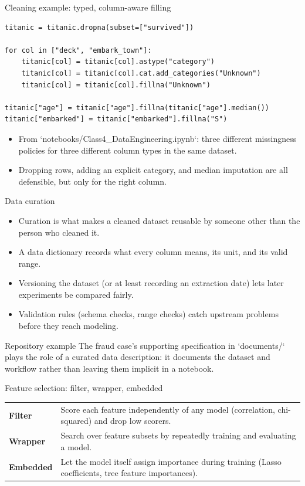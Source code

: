 \begin{frame}[fragile]{Cleaning example: typed, column-aware filling}
\begin{lstlisting}[style=coursepython]
titanic = titanic.dropna(subset=["survived"])

for col in ["deck", "embark_town"]:
    titanic[col] = titanic[col].astype("category")
    titanic[col] = titanic[col].cat.add_categories("Unknown")
    titanic[col] = titanic[col].fillna("Unknown")

titanic["age"] = titanic["age"].fillna(titanic["age"].median())
titanic["embarked"] = titanic["embarked"].fillna("S")
\end{lstlisting}
\begin{itemize}
\item From `notebooks/Class4_DataEngineering.ipynb`: three different missingness policies for three different column types in the same dataset.
\item Dropping rows, adding an explicit category, and median imputation are all defensible, but only for the right column.
\end{itemize}
\coursefooter
\end{frame}

\begin{frame}{Data curation}
\begin{itemize}
\item Curation is what makes a cleaned dataset reusable by someone other than the person who cleaned it.
\item A data dictionary records what every column means, its unit, and its valid range.
\item Versioning the dataset (or at least recording an extraction date) lets later experiments be compared fairly.
\item Validation rules (schema checks, range checks) catch upstream problems before they reach modeling.
\end{itemize}
\begin{block}{Repository example}
The fraud case's supporting specification in `documents/` plays the role of a curated data description: it documents the dataset and workflow rather than leaving them implicit in a notebook.
\end{block}
\coursefooter
\end{frame}

\begin{frame}{Feature selection: filter, wrapper, embedded}
\begin{tabularx}{\textwidth}{>{\bfseries}l X}
Filter & Score each feature independently of any model (correlation, chi-squared) and drop low scorers. \\
Wrapper & Search over feature subsets by repeatedly training and evaluating a model. \\
Embedded & Let the model itself assign importance during training (Lasso coefficients, tree feature importances). \\
\end{tabularx}
\coursefooter
\end{frame}


